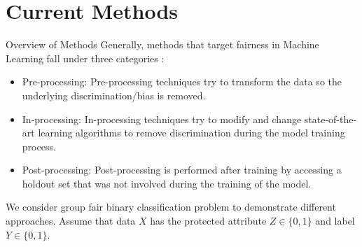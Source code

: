 \documentclass[10pt, xcolor=table,aspectratio=169]{beamer}
\begin{document}
\section{Current Methods}
\begin{frame}{Overview of Methods}
	Generally, methods that target fairness in Machine Learning fall under three categories \cite{mehrabi2021survey}:
	\begin{itemize}
		\item Pre-processing: Pre-processing techniques try to transform the data so the underlying discrimination/bias is removed.
		\item In-processing: In-processing techniques try to modify and change state-of-the-art learning algorithms to remove discrimination during the model training process.
		\item Post-processing: Post-processing is performed after training by accessing a holdout set that was not involved during the training of the model.
	\end{itemize}
	We consider group fair binary classification problem to demonstrate different approaches. Assume that data $X$ has the protected attribute $Z \in \{0,1\}$ and label $Y \in \{0,1\}$.

\end{frame}
\end{document}
